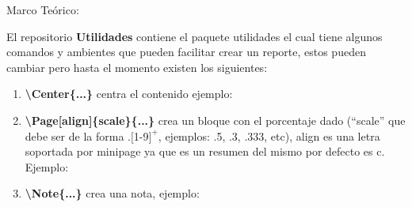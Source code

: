 \documentclass[11pt, letterpaper]{article}
\begin{document}
	\begin{block}{Marco Teórico:\\}
		
		El repositorio \textbf{Utilidades} contiene el paquete utilidades el cual tiene algunos comandos y ambientes que pueden facilitar crear un reporte, estos pueden cambiar pero hasta el momento existen los siguientes:
		
		\begin{enumerate}
			\item \textbf{\textbackslash Center\{...\}} centra el contenido ejemplo:
			
			\begin{figure}[H]
			\end{figure}
		
			\item \textbf{\textbackslash Page[align]\{scale\}\{...\}} crea un bloque con el porcentaje dado (``scale'' que debe ser de la forma $.[$1-9$]^+$, ejemplos: .5, .3, .333, etc), align es una letra soportada por minipage ya que es un resumen del mismo por defecto es c. Ejemplo:
			
			\begin{figure}[H]
				 
			\end{figure}
		
			\item \textbf{\textbackslash Note\{...\}} crea una nota, ejemplo:\\\\
			

\end{enumerate}
\end{block}
\end{document}
